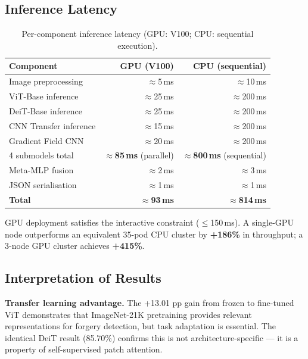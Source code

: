 \documentclass[12pt, a4paper]{article}
\begin{document}
\subsection{Inference Latency}
\label{sec:latency}

\begin{table}[H]
\centering
\caption{Per-component inference latency (GPU: V100; CPU: sequential execution).}
\label{tab:latency}
\begin{tabular}{lrr}
\toprule
\textbf{Component} & \textbf{GPU (V100)} & \textbf{CPU (sequential)} \\
\midrule
Image preprocessing   & $\approx$5\,ms  & $\approx$10\,ms  \\
ViT-Base inference    & $\approx$25\,ms & $\approx$200\,ms \\
DeiT-Base inference   & $\approx$25\,ms & $\approx$200\,ms \\
CNN Transfer inference& $\approx$15\,ms & $\approx$200\,ms \\
Gradient Field CNN    & $\approx$20\,ms & $\approx$200\,ms \\
4 submodels total     & $\approx$\textbf{85\,ms} (parallel)
                      & $\approx$\textbf{800\,ms} (sequential) \\
Meta-MLP fusion       & $\approx$2\,ms  & $\approx$3\,ms   \\
JSON serialisation    & $\approx$1\,ms  & $\approx$1\,ms   \\
\midrule
\textbf{Total}        & $\approx$\textbf{93\,ms} & $\approx$\textbf{814\,ms} \\
\bottomrule
\end{tabular}
\end{table}

GPU deployment satisfies the interactive constraint ($\leq$150\,ms).  A
single-GPU node outperforms an equivalent 35-pod CPU cluster by \textbf{+186\%}
in throughput; a 3-node GPU cluster achieves \textbf{+415\%}.

\subsection{Interpretation of Results}
\label{sec:interpretation}

\textbf{Transfer learning advantage.}
The +13.01 pp gain from frozen to fine-tuned ViT demonstrates that ImageNet-21K
pretraining provides relevant representations for forgery detection, but task
adaptation is essential.  The identical DeiT result (85.70\%) confirms this is
not architecture-specific — it is a property of self-supervised patch attention.
\end{document}
